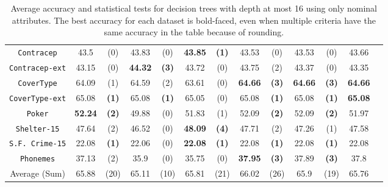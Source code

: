 \begin{table}
\begin{tabular}{c|cc|cc|cc|cc|cc|cc}
{\tt Contracep}     &  43.5        & (0)          &  43.83       & (0)          &  {\bf 43.85} & {\bf (1)}        & 43.53      & (0)          & 43.53      & (0)        & 43.66      &            \\
{\tt Contracep-ext} &  43.15       & (0)          &  {\bf 44.32} & {\bf (3)}    &  43.72       & (0)              & 43.75      & (2)          & 43.37      & (0)        & 43.35      &            \\
{\tt CoverType}     &  64.09       & (1)          &  64.59       & (2)          &  63.61       & (0)              &{\bf 64.66} & {\bf (3)}    & {\bf 64.66}& {\bf (3)}  & {\bf 64.66}&            \\
{\tt CoverType-ext} &  65.08       & {\bf (1)}    &  65.08       & {\bf (1)}    &  65.05       & (0)              & 65.08      & {\bf (1)}    & 65.08      & {\bf (1)}  & {\bf 65.08}&            \\
{\tt Poker}         &  {\bf 52.24} & {\bf (2)}    &  49.88       & (0)          &  51.83       & (1)              & 52.09      & {\bf (2)}    & 52.09      & {\bf (2)}  & 51.97      &            \\
{\tt Shelter-15}    &  47.64       & (2)          &  46.52       & (0)          & {\bf 48.09}  & {\bf (4)}        & 47.71      & (2)          & 47.26      & (1)        & 47.58      &            \\
{\tt S.F. Crime-15} &  22.08       & {\bf (1)}    &  22.06       & (0)          & {\bf 22.08}  & {\bf (1)}        & 22.08      & {\bf (1)}    & 22.08      & {\bf (1)}  & 22.08      &            \\
{\tt Phonemes}      &  37.13       & (2)          &  35.9        & (0)          & 35.75        & (0)              &{\bf 37.95} & {\bf (3)}    & 37.89      & {\bf (3)}  & 37.8       &            \\
\hline
Average (Sum)       &  65.88       & (20)         &  65.11       & (10)         & 65.81        & (21)             &  66.02     & (26)         & 65.9       & (19)       & 65.76      &
\end{tabular}
\normalsize
\caption{Average accuracy and statistical tests  for  decision trees with depth at most 16 using only nominal attributes. The best accuracy for each dataset is bold-faced, even when multiple criteria have the same accuracy in the table because of rounding.}
\label{tab:nominal-16}
\end{table}

